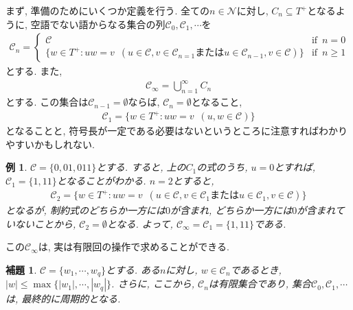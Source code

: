 \documentclass[12pt]{ltjsarticle}
\newtheorem{example}{例}
\newtheorem{lemma}{補題}
\begin{document}
まず, 準備のためにいくつか定義を行う.
全ての$n \in \mathcal{N}$に対し, $C_n \subseteq T^+$となるように, 空語でない語からなる集合の列$\mathcal{C}_0, \mathcal{C}_1, \cdots$を
\begin{align*}
  \mathcal{C}_n =
    \begin{cases}
      \mathcal{C} & \text{if} \enspace n = 0 \\
      \{w \in T^+ : uw = v \enspace (u \in \mathcal{C}, v \in \mathcal{C}_{n = 1} \text{または} u \in \mathcal{C}_{n - 1}, v \in \mathcal{C})\} & \text{if} \enspace n \geq 1
    \end{cases}
\end{align*}
とする.
また,
\begin{align*}
  \mathcal{C}_\infty = \bigcup_{n = 1}^\infty C_n
\end{align*}
とする.
この集合は$\mathcal{C}_{n - 1} = \emptyset$ならば, $\mathcal{C}_n = \emptyset$となること,
\begin{align*}
  \mathcal{C}_1 = \{w \in T^+ : uw = v \enspace (u, w \in \mathcal{C})\}
\end{align*}
となることと, 符号長が一定である必要はないというところに注意すればわかりやすいかもしれない.
\begin{example}
  $\mathcal{C} = \{0, 01, 011\}$とする.
  すると, 上の$C_1$の式のうち, $u = 0$とすれば, $\mathcal{C}_1 = \{1, 11\}$となることがわかる.
  $n = 2$とすると,
  \begin{align*}
    \mathcal{C}_2 = \{w \in T^+ : uw = v \enspace (u \in \mathcal{C}, v \in \mathcal{C}_1 または u \in \mathcal{C}_1, v \in \mathcal{C})\}
  \end{align*}
  となるが, 制約式のどちらか一方には$0$が含まれ, どちらか一方には$0$が含まれていないことから, $\mathcal{C}_2 = \emptyset$となる.
  よって, $\mathcal{C}_\infty = \mathcal{C}_1 = \{1, 11\}$である.
\end{example}
\noindent
この$\mathcal{C}_\infty$は, 実は有限回の操作で求めることができる.
\begin{screen}
  \begin{lemma}
    $\mathcal{C} = \{w_1, \cdots, w_q\}$とする.
    ある$n$に対し, $w \in \mathcal{C}_n$であるとき, $|w| \leq \max \{|w_1|, \cdots, |w_q|\}$.
    さらに, ここから, $\mathcal{C}_n$は有限集合であり, 集合$\mathcal{C}_0, \mathcal{C}_1, \cdots$は, 最終的に周期的となる.
  \end{lemma}
\end{screen}
\end{document}
